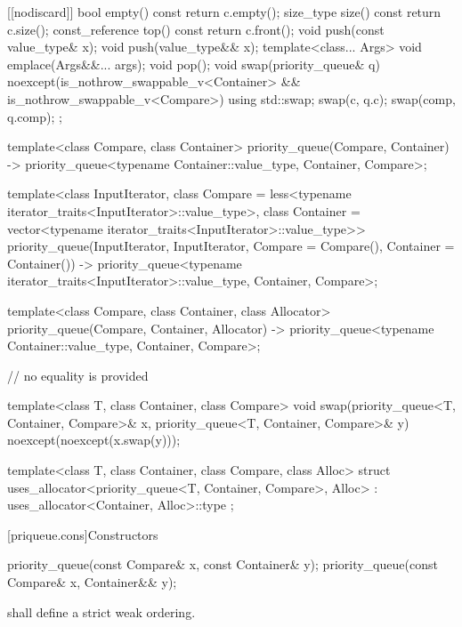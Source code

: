\begin{codeblock}
\begin{codeblock}
\begin{codeblock}
{{    [[nodiscard]] bool empty() const { return c.empty(); }
    size_type size()  const          { return c.size(); }
    const_reference   top() const    { return c.front(); }
    void push(const value_type& x);
    void push(value_type&& x);
    template<class... Args> void emplace(Args&&... args);
    void pop();
    void swap(priority_queue& q) noexcept(is_nothrow_swappable_v<Container> &&
                                          is_nothrow_swappable_v<Compare>)
      { using std::swap; swap(c, q.c); swap(comp, q.comp); }
  };

  template<class Compare, class Container>
    priority_queue(Compare, Container)
      -> priority_queue<typename Container::value_type, Container, Compare>;

  template<class InputIterator,
           class Compare = less<typename iterator_traits<InputIterator>::value_type>,
           class Container = vector<typename iterator_traits<InputIterator>::value_type>>
    priority_queue(InputIterator, InputIterator, Compare = Compare(), Container = Container())
      -> priority_queue<typename iterator_traits<InputIterator>::value_type, Container, Compare>;

  template<class Compare, class Container, class Allocator>
    priority_queue(Compare, Container, Allocator)
      -> priority_queue<typename Container::value_type, Container, Compare>;

  // no equality is provided

  template<class T, class Container, class Compare>
    void swap(priority_queue<T, Container, Compare>& x,
              priority_queue<T, Container, Compare>& y) noexcept(noexcept(x.swap(y)));

  template<class T, class Container, class Compare, class Alloc>
    struct uses_allocator<priority_queue<T, Container, Compare>, Alloc>
      : uses_allocator<Container, Alloc>::type { };
}
\end{codeblock}

[priqueue.cons]{Constructors}

%
\begin{itemdecl}
priority_queue(const Compare& x, const Container& y);
priority_queue(const Compare& x, Container&& y);
\end{itemdecl}

\begin{itemdescr}
\pnum
\requires
{} shall define a strict weak ordering.


\end{itemdescr}
\end{codeblock}
\end{codeblock}
